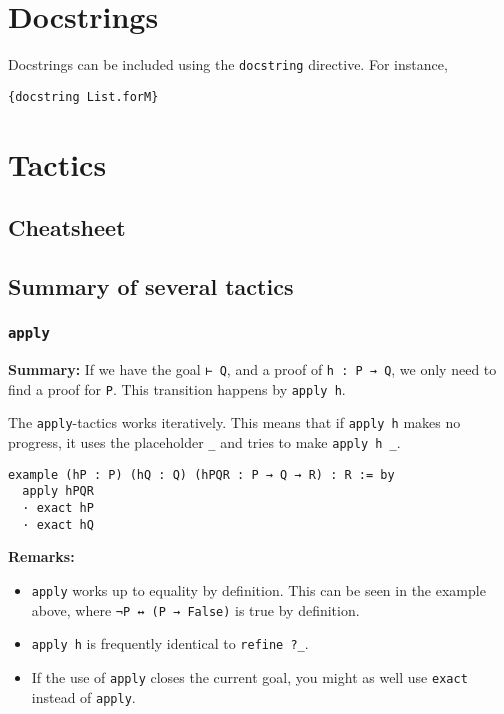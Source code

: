 \documentclass{memoir}
\begin{document}
\chapter{Docstrings}

Docstrings can be included using the \Verb|docstring| directive. For instance,

\begin{verbatim}
{docstring List.forM}

\end{verbatim}





\chapter{Tactics}



\section{Cheatsheet}





\section{Summary of several tactics}



\subsection{\Verb|apply|}

\textbf{Summary:} If we have the goal \Verb|⊢ Q|, and a proof of \Verb|h : P → Q|, we only need to find a proof for \Verb|P|. This transition happens by \Verb|apply h|.



The \Verb|apply|-tactics works iteratively. This means that if \Verb|apply h| makes no progress, it uses the placeholder \Verb|_| and tries to make \Verb|apply h _|.

\begin{verbatim}
example (hP : P) (hQ : Q) (hPQR : P → Q → R) : R := by
  apply hPQR
  · exact hP
  · exact hQ

\end{verbatim}



\textbf{Remarks:}

\begin{itemize}
\item \Verb|apply| works up to equality by definition. This can be seen in the example above, where \Verb|¬P ↔ (P → False)| is true by definition.\item \Verb|apply h| is frequently identical to \Verb|refine ?_|.\item If the use of \Verb|apply| closes the current goal, you might as well use \Verb|exact| instead of \Verb|apply|.
\end{itemize}
\end{document}
